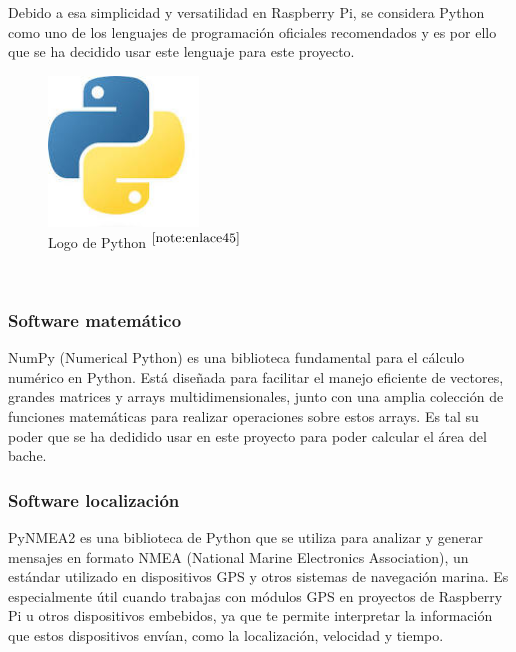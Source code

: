 Debido a esa simplicidad y versatilidad en Raspberry Pi, se considera Python como uno de los lenguajes de programación oficiales recomendados y es por ello que se ha decidido usar este lenguaje para este proyecto.

\begin{figure} [h!]
	\begin{center}
		\includegraphics[width=4cm]{figs/python.png}
	\end{center}
	\caption{Logo de Python $^{\ref{note:enlace45}}$} 
	\label{fig:python}
\end{figure}\

\setcounter{footnote}{45} %

\subsubsection{Software matemático}

NumPy (Numerical Python) es una biblioteca fundamental para el cálculo numérico en Python. Está diseñada para facilitar el manejo eficiente de vectores, grandes matrices y arrays multidimensionales, junto con una amplia colección de funciones matemáticas para realizar operaciones sobre estos arrays. Es tal su poder que se ha dedidido usar en este proyecto para poder calcular el área del bache.

\subsubsection{Software localización}

PyNMEA2 es una biblioteca de Python que se utiliza para analizar y generar mensajes en formato NMEA (National Marine Electronics Association), un estándar utilizado en dispositivos GPS y otros sistemas de navegación marina. Es especialmente útil cuando trabajas con módulos GPS en proyectos de Raspberry Pi u otros dispositivos embebidos, ya que te permite interpretar la información que estos dispositivos envían, como la localización, velocidad y tiempo.

